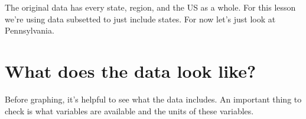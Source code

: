 \documentclass[
]{krantz}
\makeatletter
\newenvironment{Shaded}{\begin{snugshade}}{\end{snugshade}}
\newcommand{\NormalTok}[1]{#1}
\newcommand{\OtherTok}[1]{\textcolor[rgb]{0.37,0.37,0.37}{#1}}
\newcommand{\SpecialCharTok}[1]{\textcolor[rgb]{0,0,0}{#1}}
\newcommand{\StringTok}[1]{\textcolor[rgb]{0.5,0.5,0.5}{#1}}
\newenvironment{kframe}{%
\medskip{}
\setlength{\fboxsep}{.8em}
 \def\at@end@of@kframe{}%
 \ifinner\ifhmode%
  \def\at@end@of@kframe{\end{minipage}}%
  \begin{minipage}{\columnwidth}%
 \fi\fi%
 \def\FrameCommand##1{\hskip\@totalleftmargin \hskip-\fboxsep
 \colorbox{shadecolor}{##1}\hskip-\fboxsep
     \hskip-\linewidth \hskip-\@totalleftmargin \hskip\columnwidth}%
 \MakeFramed {\advance\hsize-\width
   \@totalleftmargin\z@ \linewidth\hsize
   \@setminipage}}%
 {\par\unskip\endMakeFramed%
 \at@end@of@kframe}
\renewenvironment{Shaded}{\begin{kframe}}{\end{kframe}}
\makeatother
\begin{document}
The original data has every state, region, and the US as a whole. For this lesson we're using data subsetted to just include states. For now let's just look at Pennsylvania.

\begin{Shaded}
\end{Shaded}

\hypertarget{what-does-the-data-look-like}{%
\section{What does the data look like?}\label{what-does-the-data-look-like}}

Before graphing, it's helpful to see what the data includes. An important thing to check is what variables are available and the units of these variables.
\end{document}
